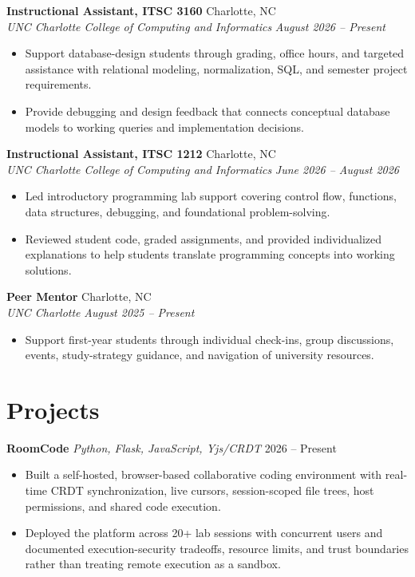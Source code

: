 \documentclass[letterpaper,10pt]{article}
\newcommand{\resumeentry}[4]{
  \noindent\textbf{#1} \hfill #2 \\
  \textit{#3} \hfill \textit{#4}
}
\newcommand{\projectentry}[3]{
  \noindent\textbf{#1} \textbar{} \textit{#2} \hfill #3
}
\begin{document}
\smallskip

\resumeentry
  {Instructional Assistant, ITSC 3160}{Charlotte, NC}
  {UNC Charlotte College of Computing and Informatics}{August 2026 -- Present}
\begin{itemize}
  \item Support database-design students through grading, office hours, and targeted assistance with relational modeling, normalization, SQL, and semester project requirements.
  \item Provide debugging and design feedback that connects conceptual database models to working queries and implementation decisions.
\end{itemize}

\smallskip

\resumeentry
  {Instructional Assistant, ITSC 1212}{Charlotte, NC}
  {UNC Charlotte College of Computing and Informatics}{June 2026 -- August 2026}
\begin{itemize}
  \item Led introductory programming lab support covering control flow, functions, data structures, debugging, and foundational problem-solving.
  \item Reviewed student code, graded assignments, and provided individualized explanations to help students translate programming concepts into working solutions.
\end{itemize}

\smallskip

\resumeentry
  {Peer Mentor}{Charlotte, NC}
  {UNC Charlotte}{August 2025 -- Present}
\begin{itemize}
  \item Support first-year students through individual check-ins, group discussions, events, study-strategy guidance, and navigation of university resources.
\end{itemize}


\section{Projects}

\projectentry
  {RoomCode}
  {Python, Flask, JavaScript, Yjs/CRDT}
  {2026 -- Present}
\begin{itemize}
  \item Built a self-hosted, browser-based collaborative coding environment with real-time CRDT synchronization, live cursors, session-scoped file trees, host permissions, and shared code execution.
  \item Deployed the platform across 20+ lab sessions with concurrent users and documented execution-security tradeoffs, resource limits, and trust boundaries rather than treating remote execution as a sandbox.
\end{itemize}
\end{document}
